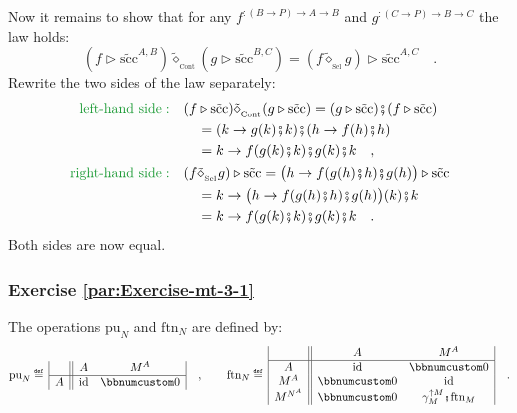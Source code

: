 Now it remains to show that for any $f^{:\left(B\rightarrow P\right)\rightarrow A\rightarrow B}$
and $g^{:\left(C\rightarrow P\right)\rightarrow B\rightarrow C}$
the law holds:
\[
(f\triangleright\tilde{\text{scc}}^{A,B})\tilde{\diamond}_{_{\text{Cont}}}(g\triangleright\tilde{\text{scc}}^{B,C})=(f\tilde{\diamond}_{_{\text{Sel}}}g)\triangleright\tilde{\text{scc}}^{A,C}\quad.
\]
Rewrite the two sides of the law separately:
\begin{align*}
{\color{greenunder}\text{left-hand side}:}\quad & (f\triangleright\tilde{\text{scc}})\tilde{\diamond}_{_{\text{Cont}}}(g\triangleright\tilde{\text{scc}})=(g\triangleright\tilde{\text{scc}})\bef(f\triangleright\tilde{\text{scc}})\\
 & \quad=(k\rightarrow g(k)\bef k)\bef(h\rightarrow f(h)\bef h)\\
 & \quad=k\rightarrow f(g(k)\bef k)\bef g(k)\bef k\quad,\\
{\color{greenunder}\text{right-hand side}:}\quad & (f\tilde{\diamond}_{_{\text{Sel}}}g)\triangleright\tilde{\text{scc}}=\big(h\rightarrow f(g(h)\bef h)\bef g(h)\big)\triangleright\tilde{\text{scc}}\\
 & \quad=k\rightarrow\big(h\rightarrow f(g(h)\bef h)\bef g(h)\big)(k)\bef k\\
 & \quad=k\rightarrow f(g(k)\bef k)\bef g(k)\bef k\quad.
\end{align*}
Both sides are now equal.

\subsubsection*{Exercise \ref{par:Exercise-mt-3-1}}

The operations $\text{pu}_{N}$ and $\text{ftn}_{N}$ are defined
by:
\[
\text{pu}_{N}\triangleq\,\begin{array}{|c||cc|}
 & A & M^{A}\\
\hline A & \text{id} & \bbnum 0
\end{array}\quad,\quad\quad\text{ftn}_{N}\triangleq\,\begin{array}{|c||cc|}
 & A & M^{A}\\
\hline A & \text{id} & \bbnum 0\\
M^{A} & \bbnum 0 & \text{id}\\
M^{N^{A}} & \bbnum 0 & \gamma_{M}^{\uparrow M}\bef\text{ftn}_{M}
\end{array}\quad.
\]

